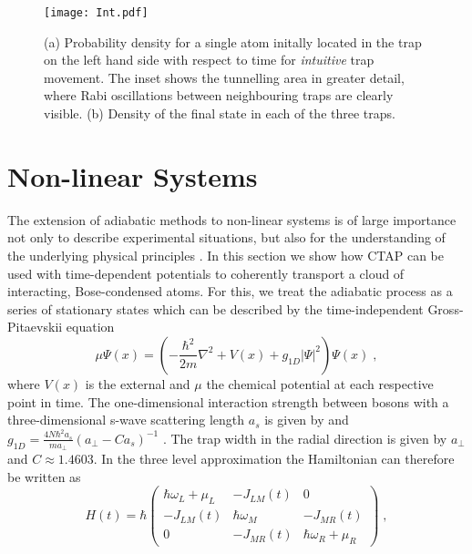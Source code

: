 \begin{figure}[tb]
 \texttt{[image: Int.pdf]}
 \caption{(a) Probability density for a single atom initally located
   in the trap on the left hand side with respect to time for {\sl
     intuitive} trap movement. The inset shows the tunnelling area in
   greater detail, where Rabi oscillations between neighbouring traps
   are clearly visible. (b) Density of the final state in each of the
   three traps.}
\label{fig:I1Atom}
\end{figure}


\section{Non-linear Systems}
\label{sec:Nonlinear}


The extension of adiabatic methods to non-linear systems is of large
importance not only to describe experimental situations, but also for
the understanding of the underlying physical principles
\cite{Liu:06,Graefe:06,Smerzi:97,Marino:99}.  In this section we show
how CTAP can be used with time-dependent potentials to coherently
transport a cloud of interacting, Bose-condensed atoms. For this, we
treat the adiabatic process as a series of stationary states which can
be described by the time-independent Gross-Pitaevskii equation
\begin{equation}
  \label{eq:GP}
  \mu\Psi(x)=\left(-\frac{\hbar^2}{2m}\nabla^2 
                          + V(x) + g_{1D}\vert\Psi\vert^2\right)\Psi(x)\;,
\end{equation}
where $V(x)$ is the external and $\mu$ the chemical potential at each
respective point in time. The one-dimensional interaction strength
between bosons with a three-dimensional s-wave scattering length $a_s$
is given by and $g_{1D}=\frac{4 N\hbar^2 a_s}{m a_\perp}(a_\perp-C
a_s)^{-1}$ \cite{Olshanii:98}. The trap width in the radial direction
is given by $a_\perp$ and $C\approx1.4603$. In the three level
approximation the Hamiltonian can therefore be written as
\begin{equation}
  \label{eq:NLHamiltonian}
  H(t)=\hbar
  \left(\begin{array}{ccc}
      \hbar\omega_L+\mu_L   & -J_{LM}(t)    & 0  \\
      -J_{LM}(t)            & \hbar\omega_M & -J_{MR}(t) \\
      0                     & -J_{MR}(t)    & \hbar\omega_R+\mu_R  
    \end{array}\right) \;,
\end{equation}
